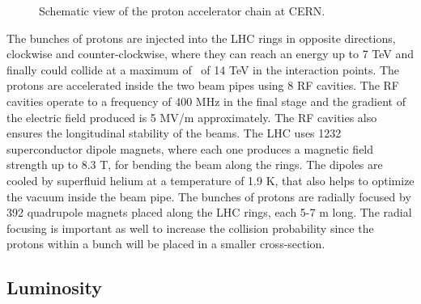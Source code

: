 \begin{figure}[ht]
\begin{center}
\caption{Schematic view of the proton accelerator chain at CERN.}\label{chp2:LHCaccelerationchain}
\end{center}
\end{figure}

The bunches of protons are injected into the LHC rings in opposite directions, clockwise and 
counter-clockwise, where they can reach an energy up to 7 TeV and finally could collide at a maximum of
\centermassenergy~of 14 TeV in the interaction points. The protons are accelerated inside the two 
beam pipes using 8 RF cavities. The RF cavities operate to a frequency of 400 MHz in the final 
stage and the gradient of the electric field produced is 5 MV/m approximately. The RF cavities also
ensures the longitudinal stability of the beams. The LHC uses 1232 superconductor dipole magnets, where 
each one produces a magnetic field strength up to 8.3 T, for bending the beam along the rings. The dipoles 
are cooled by superfluid helium at a temperature of 1.9 K, that also helps to optimize the vacuum
inside the beam pipe. The bunches of protons are radially focused by 392 quadrupole magnets placed
along the LHC rings, each 5-7 m long. The radial focusing is important as well to increase 
the collision probability since the protons within a bunch will be placed in a smaller cross-section. \\

\subsection{Luminosity}
\label{sec:Luminosity}



